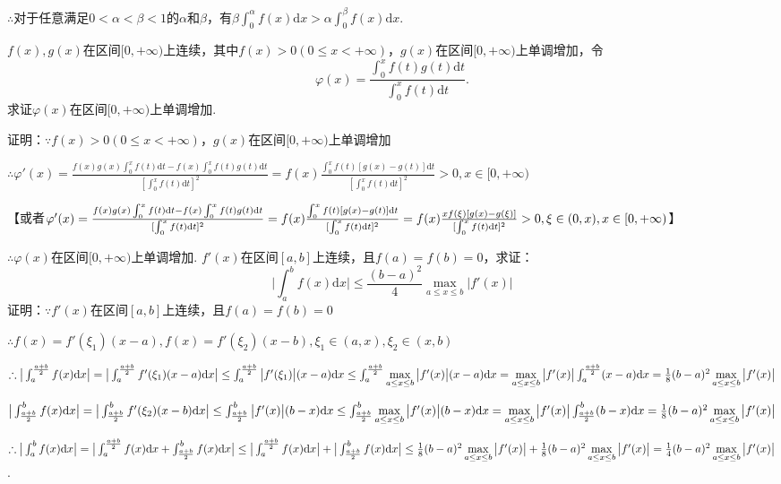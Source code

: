 \documentclass[12pt,UTF8]{ctexart}
\begin{document}
\begin{enumerate}
$\therefore$对于任意满足$0<\alpha<\beta<1$的$\alpha$和$\beta$，有$\beta\int_0^\alpha f(x)\mathrm dx>\alpha\int_0^\beta f(x)\mathrm dx$.

$f(x),g(x)$在区间$[0,+\infty)$上连续，其中$f(x)>0(0\leq x<+\infty)$，$g(x)$在区间$[0,+\infty)$上单调增加，令
\[
\varphi(x)=\frac{\int_0^xf(t)g(t)\mathrm dt}{\int_0^xf(t)\mathrm dt}.
\]
求证$\varphi(x)$在区间$[0,+\infty)$上单调增加.

证明：$\because f(x)>0(0\leq x<+\infty)$，$g(x)$在区间$[0,+\infty)$上单调增加

$\therefore\varphi'(x)=\frac{f(x)g(x)\int_0^xf(t)\mathrm dt-f(x)\int_0^xf(t)g(t)\mathrm dt}{[\int_0^xf(t)\mathrm dt]^2}=f(x)\frac{\int_0^xf(t)[g(x)-g(t)]\mathrm dt}{[\int_0^xf(t)\mathrm dt]^2}>0,x\in[0,+\infty)$

【或者$\varphi'(x)=\frac{f(x)g(x)\int_0^xf(t)\mathrm dt-f(x)\int_0^xf(t)g(t)\mathrm dt}{[\int_0^xf(t)\mathrm dt]^2}=f(x)\frac{\int_0^xf(t)[g(x)-g(t)]\mathrm dt}{[\int_0^xf(t)\mathrm dt]^2}\\
=f(x)\frac{xf(\xi)[g(x)-g(\xi)]}{[\int_0^xf(t)\mathrm dt]^2}>0,\xi\in(0,x),x\in[0,+\infty)$】

$\therefore\varphi(x)$在区间$[0,+\infty)$上单调增加.
$f'(x)$在区间$[a,b]$上连续，且$f(a)=f(b)=0$，求证：
\[
\Big|\int_a^bf(x)\mathrm dx\Big|\leq\frac{(b-a)^2}4\max\limits_{a\leq x\leq b}|f'(x)|
\]
证明：$\because f'(x)$在区间$[a,b]$上连续，且$f(a)=f(b)=0$

$\therefore f(x)=f'(\xi_1)(x-a),f(x)=f'(\xi_2)(x-b),\xi_1\in(a,x),\xi_2\in(x,b)$

$\therefore\big|\int_a^{\frac{a+b}2}f(x)\mathrm dx\big|=\big|\int_a^{\frac{a+b}2}f'(\xi_1)(x-a)\mathrm dx\big|\leq\int_a^{\frac{a+b}2}\big|f'(\xi_1)\big|(x-a)\mathrm dx\\
\leq\int_a^{\frac{a+b}2}\max\limits_{a\leq x\leq b}\big|f'(x)\big|(x-a)\mathrm dx=\max\limits_{a\leq x\leq b}\big|f'(x)\big|\int_a^{\frac{a+b}2}(x-a)\mathrm dx=\frac18(b-a)^2\max\limits_{a\leq x\leq b}\big|f'(x)\big|$

$\big|\int_{\frac{a+b}2}^bf(x)\mathrm dx\big|=\big|\int_{\frac{a+b}2}^bf'(\xi_2)(x-b)\mathrm dx\big|\leq\int_{\frac{a+b}2}^b\big|f'(x)\big|(b-x)\mathrm dx\\
\leq\int_{\frac{a+b}2}^b\max\limits_{a\leq x\leq b}\big|f'(x)\big|(b-x)\mathrm dx=\max\limits_{a\leq x\leq b}\big|f'(x)\big|\int_{\frac{a+b}2}^b(b-x)\mathrm dx=\frac18(b-a)^2\max\limits_{a\leq x\leq b}\big|f'(x)\big|$

$\therefore\big|\int_a^bf(x)\mathrm dx\big|=\big|\int_a^{\frac{a+b}2}f(x)\mathrm dx+\int_{\frac{a+b}2}^bf(x)\mathrm dx\big|\leq\big|\int_a^{\frac{a+b}2}f(x)\mathrm dx\big|+\big|\int_{\frac{a+b}2}^bf(x)\mathrm dx\big|\\
\leq\frac18(b-a)^2\max\limits_{a\leq x\leq b}\big|f'(x)\big|+\frac18(b-a)^2\max\limits_{a\leq x\leq b}\big|f'(x)\big|=\frac14(b-a)^2\max\limits_{a\leq x\leq b}\big|f'(x)\big|$.


\end{enumerate}
\end{document}
